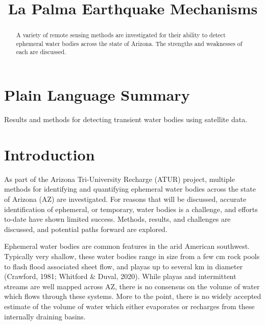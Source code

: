 \documentclass[
]{agujournal2019}
\begin{document}
\title{La Palma Earthquake Mechanisms}



\begin{abstract}
A variety of remote sensing methods are investigated for their ability
to detect ephemeral water bodies across the state of Arizona. The
strengths and weaknesses of each are discussed.
\end{abstract}

\section*{Plain Language Summary}
Results and methods for detecting transient water bodies using satellite
data.




\section{Introduction}\label{introduction}

As part of the Arizona Tri-University Recharge (ATUR) project, multiple
methods for identifying and quantifying ephemeral water bodies across
the state of Arizona (AZ) are investigated. For reasons that will be
discussed, accurate identification of ephemeral, or temporary, water
bodies is a challenge, and efforts to-date have shown limited success.
Methods, results, and challenges are discussed, and potential paths
forward are explored.

Ephemeral water bodies are common features in the arid American
southwest. Typically very shallow, these water bodies range in size from
a few cm rock pools to flash flood associated sheet flow, and playas up
to several km in diameter (Crawford, 1981; Whitford \& Duval, 2020).
While playas and intermittent streams are well mapped across AZ, there
is no consensus on the volume of water which flows through these
systems. More to the point, there is no widely accepted estimate of the
volume of water which either evaporates or recharges from these
internally draining basins.
\end{document}
